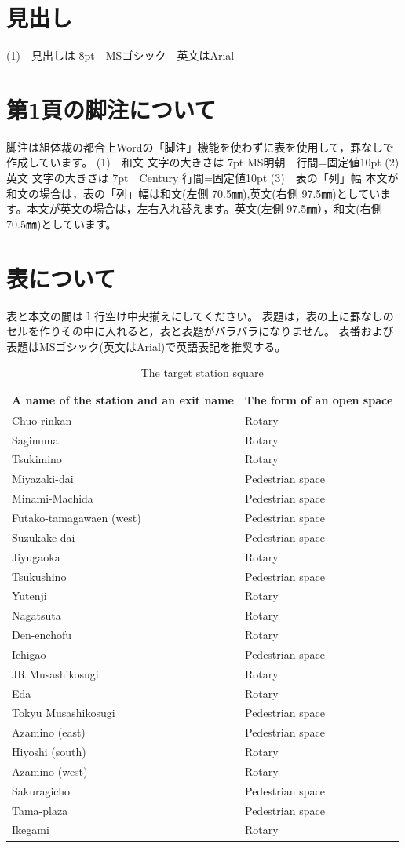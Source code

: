 \documentclass[base=11pt,magstyle=real,a4paper,twocolumn,xelatex,pandoc,jafont=ms]{bxjsarticle}
\begin{document}
\section{見出し}
(1)　見出しは 8pt　MSゴシック　英文はArial

\section{第1頁の脚注について}
脚注は組体裁の都合上Wordの「脚注」機能を使わずに表を使用して，罫なしで作成しています。
(1)　和文
文字の大きさは 7pt  MS明朝　行間=固定値10pt
(2)　英文
文字の大きさは 7pt　Century  行間=固定値10pt
(3)　表の「列」幅
本文が和文の場合は，表の「列」幅は和文(左側 70.5㎜),英文(右側 97.5㎜)としています。本文が英文の場合は，左右入れ替えます。英文(左側 97.5㎜），和文(右側 70.5㎜)としています。

\section{表について}
表と本文の間は１行空け中央揃えにしてください。
表題は，表の上に罫なしのセルを作りその中に入れると，表と表題がバラバラになりません。
表番および表題はMSゴシック(英文はArial)で英語表記を推奨する。

\begin{table}[H]
\caption{The target station square}
\small
\centering
\begin{tabular}{p{35mm}|p{35mm}}
	\hline 
	A name of the station and an exit name
 & The form of an open space
\\ 
	\hline \hline
	Chuo-rinkan & Rotary\\
	Saginuma & Rotary\\
	Tsukimino & Rotary\\
	Miyazaki-dai& Pedestrian space\\
	Minami-Machida& Pedestrian space\\
	Futako-tamagawaen (west)&Pedestrian space\\
	Suzukake-dai&Pedestrian space\\
	Jiyugaoka&Rotary\\
	Tsukushino&Pedestrian space\\
	Yutenji&Rotary\\
	Nagatsuta&Rotary\\
	Den-enchofu&Rotary\\
	Ichigao&Pedestrian space\\
	JR Musashikosugi&Rotary\\
	Eda&Rotary\\
	Tokyu Musashikosugi&	Pedestrian space\\
	Azamino (east)&Pedestrian space\\
	Hiyoshi (south)&Rotary\\
	Azamino (west)&Rotary\\
	Sakuragicho&Pedestrian space\\
	Tama-plaza&Pedestrian space\\
	Ikegami&Rotary\\
	\hline 
\end{tabular} 
\end{table}
\end{document}
